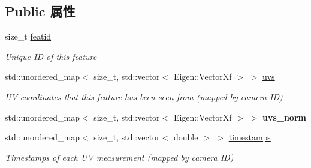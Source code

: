 \subsection*{Public 属性}
\begin{DoxyCompactItemize}
\item 
\mbox{\label{structov__msckf_1_1UpdaterHelper_1_1UpdaterHelperFeature_a36ac27ddf140e21720d08dbce50b25ec}} 
size\+\_\+t \hyperlink{structov__msckf_1_1UpdaterHelper_1_1UpdaterHelperFeature_a36ac27ddf140e21720d08dbce50b25ec}{featid}
\begin{DoxyCompactList}\small\item\em Unique ID of this feature \end{DoxyCompactList}\item 
\mbox{\label{structov__msckf_1_1UpdaterHelper_1_1UpdaterHelperFeature_ac8371fba9fe2bc7238d90176032892da}} 
std\+::unordered\+\_\+map$<$ size\+\_\+t, std\+::vector$<$ Eigen\+::\+Vector\+Xf $>$ $>$ \hyperlink{structov__msckf_1_1UpdaterHelper_1_1UpdaterHelperFeature_ac8371fba9fe2bc7238d90176032892da}{uvs}
\begin{DoxyCompactList}\small\item\em UV coordinates that this feature has been seen from (mapped by camera ID) \end{DoxyCompactList}\item 
\mbox{\label{structov__msckf_1_1UpdaterHelper_1_1UpdaterHelperFeature_af53aeb3043a029de724b564a2bc9d2d8}} 
std\+::unordered\+\_\+map$<$ size\+\_\+t, std\+::vector$<$ Eigen\+::\+Vector\+Xf $>$ $>$ {\bfseries uvs\+\_\+norm}
\item 
\mbox{\label{structov__msckf_1_1UpdaterHelper_1_1UpdaterHelperFeature_a7f9c2dcc7f4855e7034a0f3dcc964d9d}} 
std\+::unordered\+\_\+map$<$ size\+\_\+t, std\+::vector$<$ double $>$ $>$ \hyperlink{structov__msckf_1_1UpdaterHelper_1_1UpdaterHelperFeature_a7f9c2dcc7f4855e7034a0f3dcc964d9d}{timestamps}
\begin{DoxyCompactList}\small\item\em Timestamps of each UV measurement (mapped by camera ID) \end{DoxyCompactList}\item 

\end{DoxyCompactItemize}
